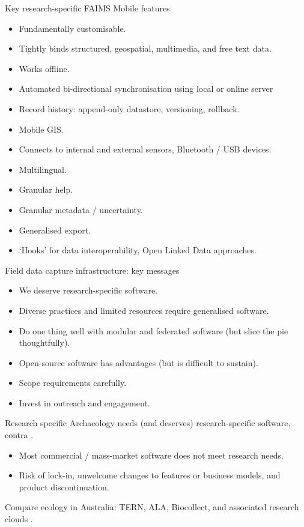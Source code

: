 \documentclass[aspectratio=169, 12pt]{beamer} %
\begin{document}
\begin{frame}{Key research-specific FAIMS Mobile features}
    \begin{itemize}[label=\textbullet]
        \item Fundamentally customisable.
        \item Tightly binds structured, geospatial, multimedia, and free text data.
        \item Works offline.
        \item Automated bi-directional synchronisation using local or online server
        \item Record history: append-only datastore, versioning, rollback.
        \item Mobile GIS.
        \item Connects to internal and external sensors, Bluetooth / USB devices.
        \item Multilingual.
        \item Granular help.
        \item Granular metadata / uncertainty.
        \item Generalised export.
        \item `Hooks’ for data interoperability, Open Linked Data approaches.
    \end{itemize}
\end{frame}

\begin{frame}{Field data capture infrastructure: key messages}
    \begin{itemize}[label=\textbullet]
        \item We deserve research-specific software.
        \item Diverse practices and limited resources require generalised software.
        \item Do one thing well with modular and federated software (but slice the pie thoughtfully).
        \item Open-source software has advantages (but is difficult to sustain). 
        \item Scope requirements carefully.
        \item Invest in outreach and engagement.
    \end{itemize}
\end{frame}

\begin{frame}{Research specific}
    Archaeology needs (and deserves) research-specific software, contra \cite{Roosevelt2015-kd}.
      \begin{itemize}[label=\textbullet]
        \item Most commercial / mass-market software does not meet research needs.
        \item Risk of lock-in, unwelcome changes to features or business models, and product discontinuation.
    \end{itemize}
    Compare ecology in Australia: TERN, ALA, Biocollect, and associated research clouds \cite{Tern2019-sp, Ala2019-by, Ala2019-cb}.
\end{frame}
\end{document}
